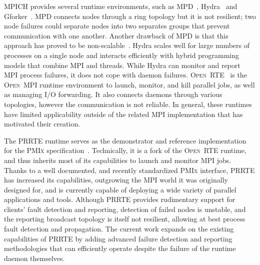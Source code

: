 \documentclass[sigconf]{acmart}
\newcommand{\prrte}[0]{\textsc{PRRTE}\xspace}
\newcommand{\pmix}[0]{\textsc{PMIx}\xspace}
\newcommand{\orte}[0]{\textsc{Open~RTE}\xspace}
\newcommand{\ompi}[0]{\textsc{Open~MPI}\xspace}
\newcommand{\mpi}[0]{\textsc{MPI}\xspace}
\begin{document}
MPICH provides several runtime environments, such as MPD~\cite{Butler00}, Hydra~\cite{MPICH14} and Gforker~\cite{MPICH14}. MPD connects nodes through a ring topology but it is not resilient; two node failures could separate nodes into two separates groups that prevent communication with one another. Another drawback of MPD is that this approach has proved to be non-scalable~\cite{Bosilca11}.
Hydra scales well for large numbers of processes on a single node and interacts efficiently with hybrid programming models that combine \mpi and threads. While Hydra can monitor
and report MPI process failures, it does not cope with daemon failures.
%
\orte~\cite{Castain05, Jeffrey12} is the \ompi runtime environment to launch, monitor, and kill parallel jobs, as well as managing I/O forwarding. It also connects daemons through various topologies, however the communication is not reliable. In general, these runtimes have limited applicability outside of the related \mpi implementation that has motivated their creation.

The \prrte runtime serves as the demonstrator and reference implementation
for the \pmix specification~\cite{CASTAIN18}. Technically, it is a fork of
the \orte runtime, and thus inherits most of its capabilities to launch
and monitor \mpi jobs. Thanks to a well documented, and recently standardized \pmix interface, \prrte
has increased its capabilities, outgrowing the MPI world it was originally designed for, and is currently capable of
deploying a wide variety of parallel applications and tools.
Although \prrte provides rudimentary support for clients' fault detection and reporting,
detection of failed nodes is unstable, and the reporting
broadcast topology is itself not resilient, allowing at best process fault detection and propagation.
The current work expands on the existing capabilities of \prrte by adding
advanced failure detection and reporting methodologies that can efficiently operate
despite the failure of the runtime daemon themselves.
\end{document}
